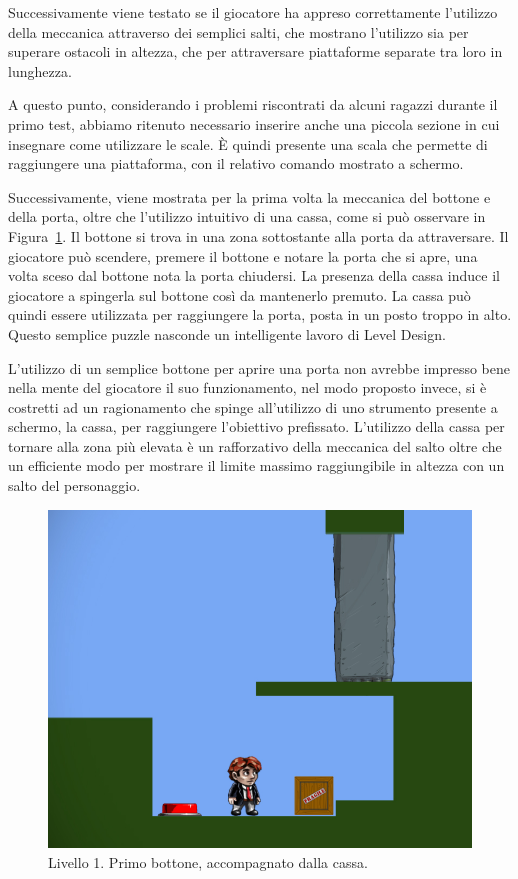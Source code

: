 Successivamente viene testato se il giocatore ha appreso correttamente l’utilizzo della meccanica attraverso dei semplici salti, che mostrano l’utilizzo sia per superare ostacoli in altezza, che per attraversare piattaforme separate tra loro in lunghezza.

A questo punto, considerando i problemi riscontrati da alcuni ragazzi durante il primo test, abbiamo ritenuto necessario inserire anche una piccola sezione in cui insegnare come utilizzare le scale. È quindi presente una scala che permette di raggiungere una piattaforma, con il relativo comando mostrato a schermo.

Successivamente, viene mostrata per la prima volta la meccanica del bottone e della porta, oltre che l’utilizzo intuitivo di una cassa, come si può osservare in Figura~\ref{fig:livello1_bottone}. Il bottone si trova in una zona sottostante alla porta da attraversare. Il giocatore può scendere, premere il bottone e notare la porta che si apre, una volta sceso dal bottone nota la porta chiudersi. La presenza della cassa induce il giocatore a spingerla sul bottone così da mantenerlo premuto. La cassa può quindi essere utilizzata per raggiungere la porta, posta in un posto troppo in alto. Questo semplice puzzle nasconde un intelligente lavoro di Level Design. 

L’utilizzo di un semplice bottone per aprire una porta non avrebbe impresso bene nella mente del giocatore il suo funzionamento, nel modo proposto invece, si è costretti ad un ragionamento che spinge all’utilizzo di uno strumento presente a schermo, la cassa, per raggiungere l’obiettivo prefissato. L’utilizzo della cassa per tornare alla zona più elevata è un rafforzativo della meccanica del salto oltre che un efficiente modo per mostrare il limite massimo raggiungibile in altezza con un salto del personaggio.

\begin{figure}%
	\centering
	\includegraphics[width= 0.65\columnwidth]{images/gameDesign/42_bottone.jpg}
	\caption{Livello 1. Primo bottone, accompagnato dalla cassa.}
	\label{fig:livello1_bottone}
\end{figure}

